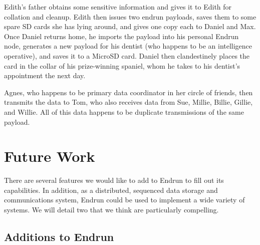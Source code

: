 \documentclass[12pt]{article}
\begin{document}
  Edith's father obtains some sensitive information and gives it to Edith for collation and cleanup. Edith then issues two endrun payloads, saves them to some spare SD cards she has lying around, and gives one copy each to Daniel and Max. Once Daniel returns home, he imports the payload into his personal Endrun node, generates a new payload for his dentist (who happens to be an intelligence operative), and saves it to a MicroSD card. Daniel then clandestinely places the card in the collar of his prize-winning spaniel, whom he takes to his dentist's appointment the next day.
  
  Agnes, who happens to be primary data coordinator in her circle of friends, then transmits the data to Tom, who also receives data from Sue, Millie, Billie, Gillie, and Willie. All of this data happens to be duplicate transmissions of the same payload.
  
  \section{Future Work}
  
  There are several features we would like to add to Endrun to fill out its capabilities. In addition, as a distributed, sequenced data storage and communications system, Endrun could be used to implement a wide variety of systems. We will detail two that we think are particularly compelling.
  
  \subsection{Additions to Endrun}
  
\end{document}
